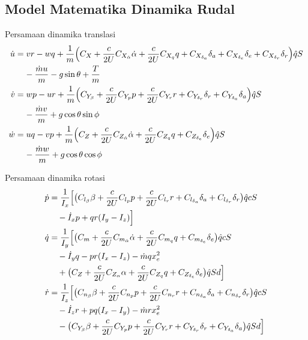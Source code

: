 \subsection{Model Matematika Dinamika Rudal}

Persamaan dinamika translasi
\begin{align}
    \dot{u}&=vr-wq+\frac{1}{m}\Bigl(C_X+\frac{c}{2U}C_{X_{\dot{\alpha}}}\dot{\alpha}+\frac{c}{2U}C_{X_{q}}q+C_{X_{\delta_a}}\delta_a+C_{X_{\delta_e}}\delta_e+C_{X_{\delta_r}}\delta_r\Bigr)\hat{q}S \notag\\ 
    & \;\;\;\; -\frac{\dot{m}u}{m}-g\sin\theta+\frac{T}{m} \\  
    \dot{v}&=wp-ur+\frac{1}{m}\Bigl(C_{Y_\beta}+\frac{c}{2U}C_{Y_p}p+\frac{c}{2U}C_{Y_r}r+C_{Y_{\delta_r}}\delta_r+C_{Y_{\delta_a}}\delta_a\Bigr)\hat{q}S \notag\\
    & \;\;\;\; -\frac{\dot{m}v}{m}+g\cos\theta \sin\phi \\
    \dot{w}&=uq-vp+\frac{1}{m}\Bigl(C_Z+\frac{c}{2U}C_{Z_{\dot{\alpha}}}\dot{\alpha}+\frac{c}{2U}C_{Z_{q}}q+C_{Z_{\delta_e}}\delta_e\Bigr)\hat{q}S \notag \\
    &\;\;\;\; -\frac{\dot{m}w}{m}+g\cos\theta \cos\phi \label{dinamika translasi}
\end{align}

Persamaan dinamika rotasi
\begin{align}
    \Dot{p} &= \frac{1}{I_x}\Bigl[\bigl(C_{l_{\beta}}\beta+\frac{c}{2U}C_{l_p}p+\frac{c}{2U}C_{l_r}r+C_{l_{\delta_a}}\delta_a+C_{l_{\delta_r}}\delta_r\bigr)\hat{q}cS \notag \\
    &\quad -\Dot{I}_xp+qr(I_y-I_z)\Bigr]  \\
    \Dot{q} &= \frac{1}{I_y}\Bigl[\bigl(C_m+\frac{c}{2U}C_{m_{\Dot{\alpha}}}\Dot{\alpha}+\frac{c}{2U}C_{m_q}q+C_{m_{\delta_e}}\delta_e\bigr)\hat{q}cS \notag \\ 
    &\quad -\Dot{I}_yq-pr(I_x-I_z)-\Dot{m}qx_e^2 \notag \\
    &\quad + \bigl(C_Z+\frac{c}{2U}C_{Z_{\alpha}}\alpha+\frac{c}{2U}C_{Z_q}q+C_{Z_{\delta_e}}\delta_e\bigr)\hat{q}S d \Bigr]  \\
    \Dot{r} &= \frac{1}{I_z}\Bigl[\bigl(C_{n_{\beta}}\beta+\frac{c}{2U}C_{n_p}p+\frac{c}{2U}C_{n_r}r+C_{n_{\delta_a}}\delta_a+C_{n_{\delta_r}}\delta_r\bigr)\hat{q}cS \notag \\ 
    &\quad -\Dot{I}_zr+pq(I_x-I_y)-\Dot{m}rx_e^2 \notag \\ 
    &\quad -\bigl(C_{Y_{\beta}}\beta + \frac{c}{2U}C_{Y_p}p+\frac{c}{2U}C_{Y_r}r+C_{Y_{\delta_r}}\delta_r+C_{Y_{\delta_a}}\delta_a\bigr)\hat{q}Sd\Bigr]
\end{align}


